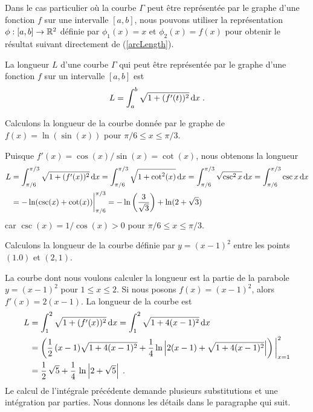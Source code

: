 {Dans le cas particulier où la courbe $\Gamma$ peut être représentée
par le graphe d'une fonction $f$ sur une intervalle $[a,b]$, nous pouvons
utiliser la représentation $\phi:[a,b]\rightarrow \mathbb{R}^2$ définie par
$\phi_1(x)=x$ et $\phi_2(x) = f(x)$ pour obtenir le résultat suivant
directement de (\ref{arcLength}).

\begin{focus}{\prp}
La longueur $L$ d'une courbe $\Gamma$ qui peut être représentée par le
graphe d'une fonction $f$ sur un intervalle $[a,b]$ est
\begin{equation}\label{arcLength2}
L = \int_a^b \sqrt{ 1 + (f'(t))^2} \,\mathrm{d}x \; .
\end{equation}
\end{focus}

\begin{egg}
Calculons la longueur de la courbe donnée par le graphe de
$f(x) = \ln(\sin(x))$ pour $\pi/6 \leq x \leq \pi/3$.

Puisque $f'(x) = \cos(x)/\sin(x)  = \cot(x)$, nous obtenons la longueur
\begin{align*}
L&= \int_{\pi/6}^{\pi/3} \sqrt{ 1 + (f'(x))^2}\,\mathrm{d}x
= \int_{\pi/6}^{\pi/3} \sqrt{ 1 + \cot^2(x)}\,\mathrm{d}x
= \int_{\pi/6}^{\pi/3} \sqrt{ \csc^2{x} }\,\mathrm{d}x
= \int_{\pi/6}^{\pi/3} \csc{x}\,\mathrm{d}x \\
&= - \ln(\csc(x)+\cot(x)) \bigg|_{\pi/6}^{\pi/3}
= -\ln\left(\frac{3}{\sqrt{3}}\right) + \ln(2+\sqrt{3})
\end{align*}
car $\csc(x) = 1/\cos(x) >0$ pour $\pi/6 \leq x \leq \pi/3$.
\end{egg}

\begin{egg}
Calculons la longueur de la courbe définie par $y = (x-1)^2$ entre les
points $(1.0)$ et $(2,1)$.

La courbe dont nous voulons calculer la longueur est la partie de la
parabole $y= (x-1)^2$ pour $1\leq x \leq 2$.  Si nous posons
$f(x) = (x-1)^2$, alors $f'(x) = 2(x-1)$.  La longueur de la courbe est
\begin{align*}
L &= \int_1^2 \sqrt{1+(f'(x))^2} \,\mathrm{d}x
= \int_1^2 \sqrt{1+4(x-1)^2} \,\mathrm{d}x \\
&= \left( \frac{1}{2}\,(x-1)\sqrt{1+4(x-1)^2} + \frac{1}{4}
\ln\left| 2(x-1) + \sqrt{1+4(x-1)^2} \right| \right)\bigg|_{x=1}^2 \\
&= \frac{1}{2}\, \sqrt{5} + \frac{1}{4}\, \ln\left| 2 + \sqrt{5}\right| \; .
\end{align*}
Le calcul de l'intégrale précédente demande plusieurs substitutions et
une intégration par parties.  Nous donnons les détails dans le
paragraphe qui suit.


\end{egg}}
